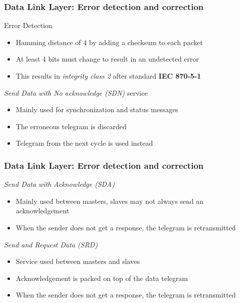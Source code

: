 \documentclass{beamer}
\begin{document}
\begin{frame}
  \frametitle{Data Link Layer: Error detection and correction}
  Error Detection
  \begin{itemize}
    \item Hamming distance of 4 by adding a checksum to each packet
    \item At least 4 bits must change to result in an undetected error
    \item This results in \textit{integrity class 2} after standard \textbf{IEC 870-5-1}
  \end{itemize}

  \vspace{10pt}
  \textit{Send Data with No acknowledge (SDN)} service
  \begin{itemize}
    \item Mainly used for synchronization and status messages
    \item The erroneous telegram is discarded
    \item Telegram from the next cycle is used instead
  \end{itemize}
\end{frame}

\begin{frame}
  \frametitle{Data Link Layer: Error detection and correction}
  \textit{Send Data with Acknowledge (SDA)}
  \begin{itemize}
    \item Mainly used between masters, slaves may not always send an acknowledgement
    \item When the sender does not get a response, the telegram is retransmitted
  \end{itemize}

  \vspace{10pt}
  \textit{Send and Request Data (SRD)}
  \begin{itemize}
    \item Service used between masters and slaves
    \item Acknowledgement is packed on top of the data telegram
    \item When the sender does not get a response, the telegram is retransmitted
  \end{itemize}
\end{frame}
\end{document}
